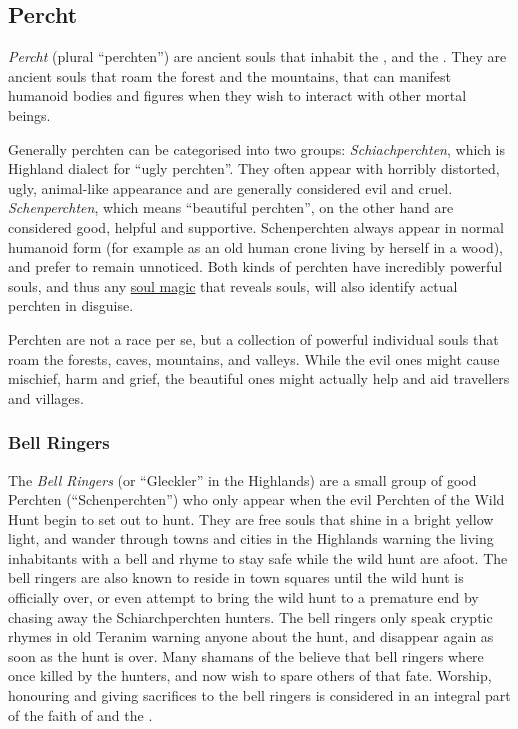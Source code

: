 \subsection{Percht}
\label{sec:Percht}

\emph{Percht} (plural ``perchten'') are ancient souls that inhabit the
, and the . They
are ancient souls that roam the forest and the mountains, that can manifest
humanoid bodies and figures when they wish to interact with other mortal
beings.

Generally perchten can be categorised into two groups: \emph{Schiachperchten},
which is Highland dialect for ``ugly perchten''. They often appear with
horribly distorted, ugly, animal-like appearance and are generally considered
evil and cruel. \emph{Schenperchten}, which means ``beautiful perchten'', on
the other hand are considered good, helpful and supportive. Schenperchten
always appear in normal humanoid form (for example as an old human crone
living by herself in a wood), and prefer to remain unnoticed. Both kinds of
perchten have incredibly powerful souls, and thus any \hyperref[sec:Soul
  Magic]{soul magic} that reveals souls, will also identify actual perchten in
disguise.

Perchten are not a race per se, but a collection of powerful individual souls
that roam the forests, caves, mountains, and valleys. While the evil ones might
cause mischief, harm and grief, the beautiful ones might actually help and aid
travellers and villages.

\subsubsection{Bell Ringers}
\label{sec:Bell Ringers}

The \emph{Bell Ringers} (or ``Gleckler'' in the Highlands) are a small group of
good Perchten (``Schenperchten'') who only appear when the evil Perchten
of the Wild Hunt begin to set out to hunt. They are free souls that shine
in a bright yellow light, and wander through towns and cities in the Highlands
warning the living inhabitants with a bell and rhyme to stay safe while
the wild hunt are afoot. The bell ringers are also known to reside in town
squares until the wild hunt is officially over, or even attempt to bring the
wild hunt to a premature end by chasing away the Schiarchperchten hunters. The
bell ringers only speak cryptic rhymes in old Teranim warning anyone about
the hunt, and disappear again as soon as the hunt is over. Many shamans of the
 believe that bell ringers where once killed by the
hunters, and now wish to spare others of that fate. Worship, honouring and
giving sacrifices to the bell ringers is considered in an integral part of the
faith of  and the .

